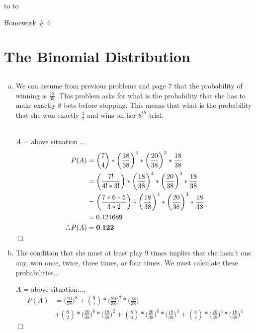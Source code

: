 \documentclass[10pt]{report}
\newenvironment{proof}{\par\noindent{\it Proof.}\hspace*{1em}}{$\Box$\bigskip}
\newcommand{\handout}{
   \renewcommand{\thepage}{}
   \noindent
   \begin{center}
      \vbox{
    \hbox to \columnwidth {\sc{\course} --- \prof \hfill}
    \vspace{-2mm}
    \hbox to \columnwidth {\sc due \MakeLowercase{\duedate} \duelocation \hfill {\LARGE\color{mdb}\yourid}}
      }
   \end{center}
      Homework \# 4
   \vspace*{2mm}
}
\def\therefore{\boldsymbol{\text{ }
\leavevmode
\lower0.4ex\hbox{$\cdot$}
\kern-.5em\raise0.7ex\hbox{$\cdot$}
\kern-0.6em\lower0.4ex\hbox{$\cdot$}
\thinspace\text{ }}}
\begin{document}
\thispagestyle{empty}
\handout

\setcounter{chapter}{2} 
\setcounter{section}{0}
\section{\sc\color{cit}The Binomial Distribution}
\setcounter{subsection}{11}
\subsection{}
 \begin{enumerate}[(a)]
        \item We can assume from previous problems and page 7 that the probability of winning is $\frac{18}{38} $. This problem asks for what is the probability that she has to make exactly 8 bets before stopping. This means that what is the probability that she won exactly $\frac{4}{7} $ and wins on her $8^{th} $ trial.
        \begin{proof}\ \\
        $A $ = above situation ...
        \begin{align*}
        P(A) &= \binom{7}{4} * \bigg(\frac{18}{38}\bigg)^4 * \bigg(\frac{20}{38}\bigg)^3 * \frac{18}{38} \\
        &= \bigg(\frac{7!}{4!* 3!}\bigg) * \bigg(\frac{18}{38}\bigg)^4 * \bigg(\frac{20}{38}\bigg)^3 * \frac{18}{38} \\
         &= \bigg(\frac{7*6*5}{3*2}\bigg) * \bigg(\frac{18}{38}\bigg)^4 * \bigg(\frac{20}{38}\bigg)^3 * \frac{18}{38} \\
         &=0.121689 \\
         \therefore P(A) &= \mathbf{0.122}
        \end{align*}
        \end{proof}
        \item The condition that she must at least play 9 times implies that she hasn't one any, won once, twice, three times, or four times. We must calculate these probabilities...
        \begin{proof}
        $A $ = above situation....
        \begin{align*}
        P(A) &= \bigg(\frac{20}{38}\bigg) ^ {8} + \binom{8}{1} * \bigg(\frac{20}{38}\bigg)^7 * \bigg(\frac{18}{38}\bigg) \\&+ \binom{8}{2} * \bigg(\frac{20}{38}\bigg)^6 * \bigg(\frac{18}{38}\bigg)^2 +\binom{8}{3} * \bigg(\frac{20}{38}\bigg)^6 * \bigg(\frac{18}{38}\bigg)^3 + \binom{8}{4} * \bigg(\frac{20}{38}\bigg)^4 * \bigg(\frac{18}{38}\bigg)^4 \\

\end{align*}
\end{proof}
\end{enumerate}
\end{document}
